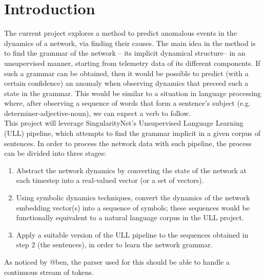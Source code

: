 






\newpage
\section{Introduction}

The current project explores a method to predict anomalous events in the dynamics of a network, via finding their causes.
The main idea in the method is to find the grammar of the network -- its implicit dynamical structure-- in an unsupervised manner, starting from telemetry data of its different components.
If such a grammar can be obtained, then it would be possible to predict (with a certain confidence) an anomaly when observing dynamics that preceed such a state in the grammar.
This would be similar to a situation in language processing where, after observing a sequence of words that form a sentence's subject (e.g. determiner-adjective-noun), we can expect a verb to follow.\\

This project will leverage SingularityNet's Unsupervised Language Learning (ULL) pipeline, which attempts to find the grammar implicit in a given corpus of sentences.
In order to process the network data with such pipeline, the process can be divided into three stages:
\begin{enumerate}
\item Abstract the network dynamics by converting the state of the network at each timestep into a real-valued vector (or a set of vectors).
\item Using symbolic dynamics techniques, convert the dynamics of the network embedding vector(s) into a sequence of symbols; these sequences would be functionally equivalent to a natural language corpus in the ULL project.
\item Apply a suitable version of the ULL pipeline to the sequences obtained in step 2 (the sentences), in order to learn the network grammar.
\end{enumerate}

As noticed by @ben, the parser used for this should be able to handle a continuous stream of tokens.

